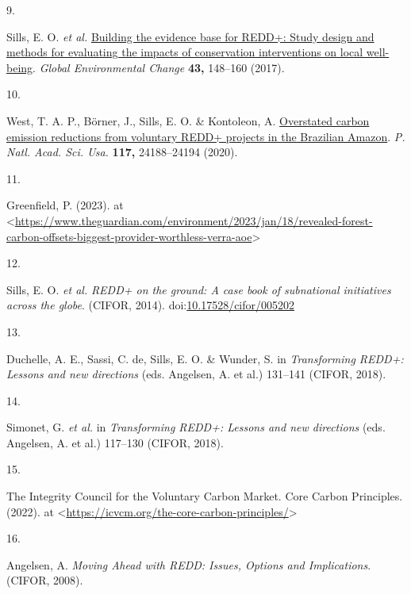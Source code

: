 \documentclass[
]{article}
\newlength{\cslhangindent}
\newlength{\csllabelwidth}
\newlength{\cslentryspacingunit} %
\newenvironment{CSLReferences}[2] %
 {%
  \setlength{\parindent}{0pt}
  \ifodd #1
  \let\oldpar\par
  \def\par{\hangindent=\cslhangindent\oldpar}
  \fi
  \setlength{\parskip}{#2\cslentryspacingunit}
 }%
 {}
\newcommand{\CSLLeftMargin}[1]{\parbox[t]{\csllabelwidth}{#1}}
\newcommand{\CSLRightInline}[1]{\parbox[t]{\linewidth - \csllabelwidth}{#1}\break}
\begin{document}
\begin{CSLReferences}{0}{0}
\leavevmode{}%
\CSLLeftMargin{9. }%
\CSLRightInline{Sills, E. O. \emph{et al.}
\href{https://doi.org/10.1016/j.gloenvcha.2017.02.002}{{Building the
evidence base for REDD+: Study design and methods for evaluating the
impacts of conservation interventions on local well-being}}.
\emph{Global Environmental Change} \textbf{43,} 148--160 (2017).}

\leavevmode{}%
\CSLLeftMargin{10. }%
\CSLRightInline{West, T. A. P., Börner, J., Sills, E. O. \& Kontoleon,
A. \href{https://doi.org/10.1073/pnas.2004334117}{{Overstated carbon
emission reductions from voluntary REDD+ projects in the Brazilian
Amazon}}. \emph{P. Natl. Acad. Sci. Usa.} \textbf{117,} 24188--24194
(2020).}

\leavevmode{}%
\CSLLeftMargin{11. }%
\CSLRightInline{Greenfield, P. (2023). at
\textless{}\url{https://www.theguardian.com/environment/2023/jan/18/revealed-forest-carbon-offsets-biggest-provider-worthless-verra-aoe}\textgreater{}}

\leavevmode{}%
\CSLLeftMargin{12. }%
\CSLRightInline{Sills, E. O. \emph{et al.} \emph{{REDD+ on the ground: A
case book of subnational initiatives across the globe}}. (CIFOR, 2014).
doi:\href{https://doi.org/10.17528/cifor/005202}{10.17528/cifor/005202}}

\leavevmode{}%
\CSLLeftMargin{13. }%
\CSLRightInline{Duchelle, A. E., Sassi, C. de, Sills, E. O. \& Wunder,
S. in \emph{Transforming REDD+: Lessons and new directions} (eds.
Angelsen, A. et al.) 131--141 (CIFOR, 2018).}

\leavevmode{}%
\CSLLeftMargin{14. }%
\CSLRightInline{Simonet, G. \emph{et al.} in \emph{Transforming REDD+:
Lessons and new directions} (eds. Angelsen, A. et al.) 117--130 (CIFOR,
2018).}

\leavevmode{}%
\CSLLeftMargin{15. }%
\CSLRightInline{The Integrity Council for the Voluntary Carbon Market.
{Core Carbon Principles}. (2022). at
\textless{}\url{https://icvcm.org/the-core-carbon-principles/}\textgreater{}}

\leavevmode{}%
\CSLLeftMargin{16. }%
\CSLRightInline{Angelsen, A. \emph{{Moving Ahead with REDD: Issues,
Options and Implications}}. (CIFOR, 2008).}


\end{CSLReferences}
\end{document}
